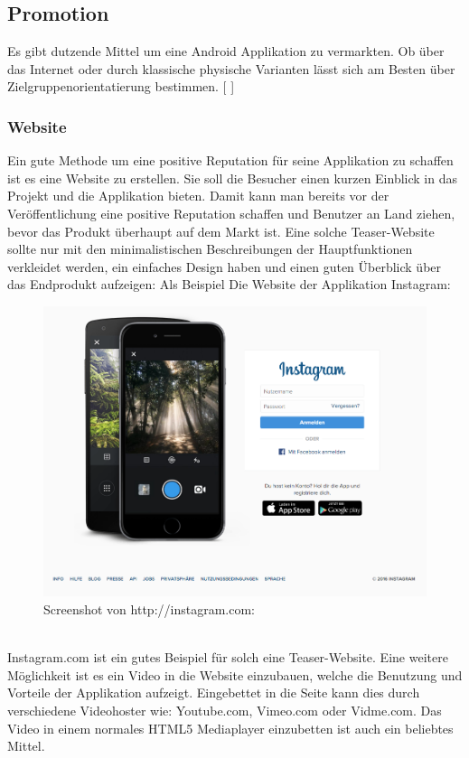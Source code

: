 \documentclass[FIPLY_base.tex]{subfiles}
\begin{document}
\subsection{Promotion}
Es gibt dutzende Mittel um eine Android Applikation zu vermarkten. Ob über das Internet oder durch klassische physische Varianten lässt sich am Besten über Zielgruppenorientatierung bestimmen. 
[ \cite{promteil1}]

\subsubsection{Website}
Ein gute Methode um eine positive Reputation für seine Applikation zu schaffen ist es eine Website zu erstellen. Sie soll die Besucher einen kurzen Einblick in das Projekt und die Applikation bieten. Damit kann man bereits vor der Veröffentlichung eine positive Reputation schaffen und Benutzer an Land ziehen, bevor das Produkt überhaupt auf dem Markt ist. Eine solche Teaser-Website sollte nur mit den minimalistischen Beschreibungen der Hauptfunktionen verkleidet werden, ein einfaches Design haben und einen guten Überblick über das Endprodukt aufzeigen: Als Beispiel Die Website der Applikation Instagram:

\begin{figure}[H]
	\centering
	\includegraphics[scale=0.3]{img/instagramdotcom}
	\caption{Screenshot von http://instagram.com:}
\end{figure}
\ \\
Instagram.com ist ein gutes Beispiel für solch eine Teaser-Website. 
Eine weitere Möglichkeit ist es ein Video in die Website einzubauen, welche die Benutzung und Vorteile der Applikation aufzeigt. Eingebettet in die Seite kann dies durch verschiedene Videohoster wie: Youtube.com, Vimeo.com oder Vidme.com. Das Video in einem normales HTML5 Mediaplayer einzubetten ist auch ein beliebtes Mittel.
\end{document}
